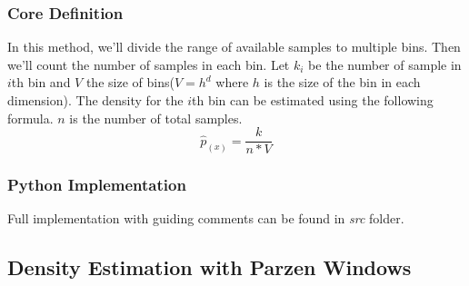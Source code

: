 \documentclass[12pt]{article}
\numberwithin{equation}{section}
\numberwithin{table}{section}
\numberwithin{figure}{section}
\begin{document}
\subsubsection*{Core Definition}
In this method, we'll divide the range of available samples to multiple bins. Then we'll count the number of samples in each bin. Let $k_i$ be the number of sample in $i$th bin and $V$ the size of bins($V = h^d$ where $h$ is the size of the bin in each dimension). The density for the $i$th bin can be estimated using the following formula. $n$ is the number of total samples.
\begin{equation}
	\hat{p}_{(x)} = \frac{k}{n * V}
\end{equation}
\subsubsection*{Python Implementation}
Full implementation with guiding comments can be found in \textit{src} folder.

\subsection*{Density Estimation with Parzen Windows}
\end{document}
